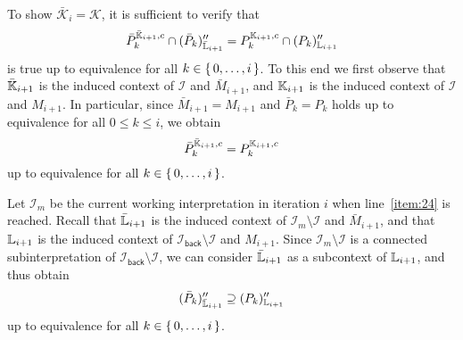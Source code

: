 \begin{Proof}
  To show $\bar{\mathcal{K}}_{i} = \mathcal{K}$, it is sufficient to verify that
  \begin{equation}
    \label{eq:56}
    \bar P_{k}^{\bar{{\mathbb{K}}}_{i+1}, c} \cap (\bar P_{k})_{\bar{{\mathbb{L}}}_{i+1}}'' =
    P_{k}^{{\mathbb{K}}_{i+1}, c} \cap (P_{k})_{{\mathbb{L}}_{i+1}}''
  \end{equation}
  is true up to equivalence for all $k \in {\ensuremath{\{\, 0, \dots, i \,\}}}$.  To this end we first
  observe that $\bar{{\mathbb{K}}}_{i+1}$ is the induced context of $\mathcal{I}$ and $\bar
  M_{i+1}$, and ${\mathbb{K}}_{i+1}$ is the induced context of $\mathcal{I}$ and $M_{i+1}$.  In
  particular, since $\bar M_{i+1} = M_{i+1}$ and $\bar P_{k} = P_{k}$ holds up to
  equivalence for all $0 \leq k \leq i$, we obtain
  \begin{equation*}
    \bar P_{k}^{\bar{{\mathbb{K}}}_{i+1}, c} = P_{k}^{{\mathbb{K}}_{i+1}, c}
  \end{equation*}
  up to equivalence for all $k \in {\ensuremath{\{\, 0, \dots, i \,\}}}$.

  Let $\mathcal{I}_{m}$ be the current working interpretation in iteration $i$ when
  line~\ref{item:24} is reached.  Recall that $\bar{{\mathbb{L}}}_{i+1}$ is the induced context
  of $\mathcal{I}_{m} \setminus \mathcal{I}$ and $\bar M_{i+1}$, and that ${\mathbb{L}}_{i+1}$
  is the induced context of $\mathcal{I}_{\mathsf{back}} \setminus \mathcal{I}$ and
  $M_{i+1}$.  Since $\mathcal{I}_{m} \setminus \mathcal{I}$ is a connected
  subinterpretation of $\mathcal{I}_{\mathsf{back}} \setminus \mathcal{I}$, we can
  consider $\bar{{\mathbb{L}}}_{i+1}$ as a subcontext of ${\mathbb{L}}_{i+1}$, and thus obtain
  \begin{equation*}
    (\bar P_{k})_{\bar{{\mathbb{L}}}_{i+1}}'' \supseteq (P_{k})_{{\mathbb{L}}_{i+1}}''
  \end{equation*}
  up to equivalence for all $k \in {\ensuremath{\{\, 0, \dots, i \,\}}}$.


\end{Proof}
